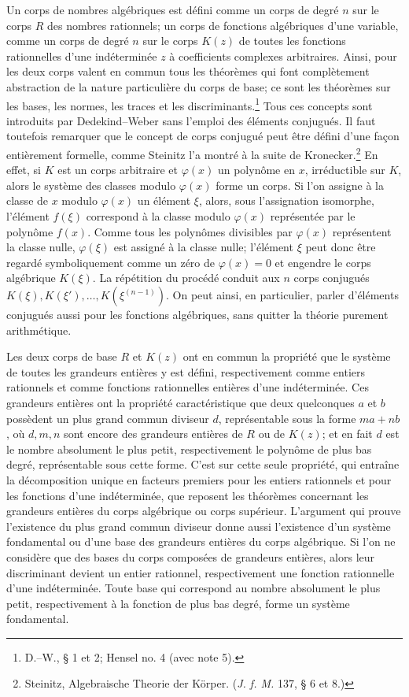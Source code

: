 Un corps de nombres algébriques est défini comme un corps de degré \(n\) sur le corps \(R\) des nombres rationnels; un corps de fonctions algébriques d'une variable, comme un corps de degré \(n\) sur le corps \(K(z)\) de toutes les fonctions rationnelles d'une indéterminée \(z\) à coefficients complexes arbitraires. Ainsi, pour les deux corps valent en commun tous les théorèmes qui font complètement abstraction de la nature particulière du corps de base; ce sont les théorèmes sur les bases, les normes, les traces et les discriminants.\footnote{D.--W., \S{} 1 et 2; Hensel no. 4 (avec note 5).} Tous ces concepts sont introduits par Dedekind--Weber sans l'emploi des éléments conjugués. Il faut toutefois remarquer que le concept de corps conjugué peut être défini d'une façon entièrement formelle, comme Steinitz l'a montré à la suite de Kronecker.\footnote{Steinitz, Algebraische Theorie der Körper. (\emph{J. f. M.} 137, \S{} 6 et 8.)} En effet, si \(K\) est un corps arbitraire et \(\varphi(x)\) un polynôme en \(x\), irréductible sur \(K\), alors le système des classes modulo \(\varphi(x)\) forme un corps. Si l'on assigne à la classe de \(x\) modulo \(\varphi(x)\) un élément \(\xi\), alors, sous l'assignation isomorphe, l'élément \(f(\xi)\) correspond à la classe modulo \(\varphi(x)\) représentée par le polynôme \(f(x)\). Comme tous les polynômes divisibles par \(\varphi(x)\) représentent la classe nulle, \(\varphi(\xi)\) est assigné à la classe nulle; l'élément \(\xi\) peut donc être regardé symboliquement comme un zéro de \(\varphi(x)=0\) et engendre le corps algébrique \(K(\xi)\). La répétition du procédé conduit aux \(n\) corps conjugués \(K(\xi),K(\xi'),\ldots,K(\xi^{(n-1)})\). On peut ainsi, en particulier, parler d'éléments conjugués aussi pour les fonctions algébriques, sans quitter la théorie purement arithmétique.

Les deux corps de base \(R\) et \(K(z)\) ont en commun la propriété que le système de toutes les grandeurs entières y est défini, respectivement comme entiers rationnels et comme fonctions rationnelles entières d'une indéterminée. Ces grandeurs entières ont la propriété caractéristique que deux quelconques \(a\) et \(b\) possèdent un plus grand commun diviseur \(d\), représentable sous la forme \(ma+nb\), où \(d,m,n\) sont encore des grandeurs entières de \(R\) ou de \(K(z)\); et en fait \(d\) est le nombre absolument le plus petit, respectivement le polynôme de plus bas degré, représentable sous cette forme. C'est sur cette seule propriété, qui entraîne la décomposition unique en facteurs premiers pour les entiers rationnels et pour les fonctions d'une indéterminée, que reposent les théorèmes concernant les grandeurs entières du corps algébrique ou corps supérieur. L'argument qui prouve l'existence du plus grand commun diviseur donne aussi l'existence d'un système fondamental ou d'une base des grandeurs entières du corps algébrique. Si l'on ne considère que des bases du corps composées de grandeurs entières, alors leur discriminant devient un entier rationnel, respectivement une fonction rationnelle d'une indéterminée. Toute base qui correspond au nombre absolument le plus petit, respectivement à la fonction de plus bas degré, forme un système fondamental.

